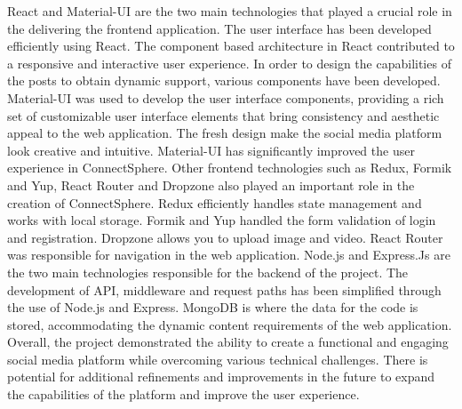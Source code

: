 React and Material-UI are the two main technologies that played a crucial role in the delivering the frontend application. The user interface has been developed efficiently using React. The component based architecture in React contributed to a responsive and interactive user experience. In order to design the capabilities of the posts to obtain dynamic support, various components have been developed. Material-UI was used to develop the user interface components, providing a rich set of customizable user interface elements that bring consistency and aesthetic appeal to the web application. The fresh design make the social media platform look creative and intuitive. Material-UI has significantly improved the user experience in ConnectSphere. Other frontend technologies such as Redux, Formik and Yup, React Router and Dropzone also played an important role in the creation of ConnectSphere. Redux efficiently handles state management and works with local storage. Formik and Yup handled the form validation of login and registration. Dropzone allows you to upload image and video. React Router was responsible for navigation in the web application. Node.js and Express.Js are the two main technologies responsible for the backend of the project. The development of API, middleware and request paths has been simplified through the use of Node.js and Express. MongoDB is where the data for the code is stored, accommodating the dynamic content requirements of the web application. Overall, the project demonstrated the ability to create a functional and engaging social media platform while overcoming various technical challenges. There is potential for additional refinements and improvements in the future to expand the capabilities of the platform and improve the user experience.